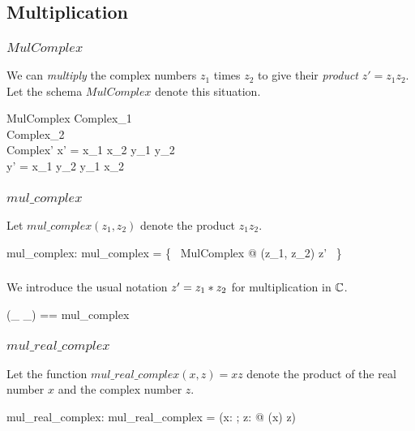 \documentclass{amsart}
\begin{document}
\subsection{Multiplication}

\subsubsection{$MulComplex$}

We can \textit{multiply} the complex numbers $z_1$ times $z_2$ to give their \textit{product} $z' = z_1 z_2$.
Let the schema $MulComplex$ denote this situation.

\begin{schema}{MulComplex}
	Complex_1 \\
	Complex_2 \\
	Complex'
\where
	x' = x_1 \mulR x_2 \subR y_1 \mulR y_2 \\
	y' = x_1 \mulR y_2 \addR y_1 \mulR x_2
\end{schema}

\subsubsection{$mul\_complex$}

Let $mul\_complex(z_1, z_2)$ denote the product $z_1 z_2$.

\begin{axdef}
	mul\_complex: \C \cross \C \fun \C
\where
	mul\_complex = \{~ MulComplex @ (z_1, z_2) \mapsto z' ~\}
\end{axdef}

\subsubsection{}

We introduce the usual notation $z' = z_1 \mathbin{*} z_2$ for multiplication in $\mathbb{C}$.

\begin{zed}
	(\_ \mulC \_) == mul\_complex
\end{zed}

\subsubsection{$mul\_real\_complex$}

Let the function $mul\_real\_complex(x, z) = xz$ denote the product of the real number $x$ and
the complex number $z$.

\begin{axdef}
	mul\_real\_complex: \R \cross \C \fun \C
\where
	mul\_real\_complex = (\lambda x: \R; z: \C @ (\asRC x) \mulC z)
\end{axdef}
\end{document}

